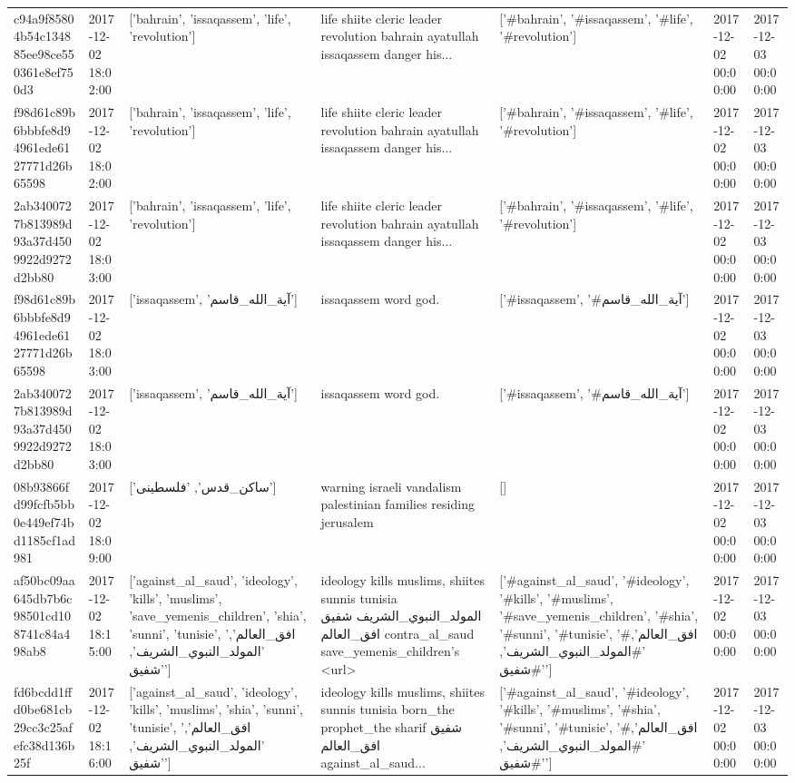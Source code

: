 \begin{tabular}{lllllll}
c94a9f85804b54c134885ee98ce550361e8ef750d3 & 2017-12-02 18:02:00 & ['bahrain', 'issaqassem', 'life', 'revolution'] & life shiite cleric leader revolution bahrain ayatullah issaqassem danger his... & ['#bahrain', '#issaqassem', '#life', '#revolution'] & 2017-12-02 00:00:00 & 2017-12-03 00:00:00 \\
f98d61c89b6bbbfe8d94961ede6127771d26b65598 & 2017-12-02 18:02:00 & ['bahrain', 'issaqassem', 'life', 'revolution'] & life shiite cleric leader revolution bahrain ayatullah issaqassem danger his... & ['#bahrain', '#issaqassem', '#life', '#revolution'] & 2017-12-02 00:00:00 & 2017-12-03 00:00:00 \\
2ab3400727b813989d93a37d4509922d9272d2bb80 & 2017-12-02 18:03:00 & ['bahrain', 'issaqassem', 'life', 'revolution'] & life shiite cleric leader revolution bahrain ayatullah issaqassem danger his... & ['#bahrain', '#issaqassem', '#life', '#revolution'] & 2017-12-02 00:00:00 & 2017-12-03 00:00:00 \\
f98d61c89b6bbbfe8d94961ede6127771d26b65598 & 2017-12-02 18:03:00 & ['issaqassem', 'آية_الله_قاسم'] & issaqassem word god. & ['#issaqassem', '#آية_الله_قاسم'] & 2017-12-02 00:00:00 & 2017-12-03 00:00:00 \\
2ab3400727b813989d93a37d4509922d9272d2bb80 & 2017-12-02 18:03:00 & ['issaqassem', 'آية_الله_قاسم'] & issaqassem word god. & ['#issaqassem', '#آية_الله_قاسم'] & 2017-12-02 00:00:00 & 2017-12-03 00:00:00 \\
08b93866fd99fcfb5bb0e449ef74bd1185cf1ad981 & 2017-12-02 18:09:00 & ['ساکن_قدس', 'فلسطینی'] & warning israeli vandalism palestinian families residing jerusalem & [] & 2017-12-02 00:00:00 & 2017-12-03 00:00:00 \\
af50bc09aa645db7b6c98501cd108741c84a498ab8 & 2017-12-02 18:15:00 & ['against_al_saud', 'ideology', 'kills', 'muslims', 'save_yemenis_children', 'shia', 'sunni', 'tunisie', 'افق_العالم', 'المولد_النبوي_الشريف', 'شفيق'] & ideology kills muslims, shiites sunnis tunisia المولد\_النبوي\_الشريف شفيق افق\_العالم contra\_al\_saud save\_yemenis\_children's <url> & ['#against_al_saud', '#ideology', '#kills', '#muslims', '#save_yemenis_children', '#shia', '#sunni', '#tunisie', '#افق_العالم', '#المولد_النبوي_الشريف', '#شفيق'] & 2017-12-02 00:00:00 & 2017-12-03 00:00:00 \\
fd6bcdd1ffd0be681cb29cc3c25afefc38d136b25f & 2017-12-02 18:16:00 & ['against_al_saud', 'ideology', 'kills', 'muslims', 'shia', 'sunni', 'tunisie', 'افق_العالم', 'المولد_النبوي_الشريف', 'شفيق'] & ideology kills muslims, shiites sunnis tunisia born\_the prophet\_the sharif شفيق افق\_العالم against\_al\_saud... & ['#against_al_saud', '#ideology', '#kills', '#muslims', '#shia', '#sunni', '#tunisie', '#افق_العالم', '#المولد_النبوي_الشريف', '#شفيق'] & 2017-12-02 00:00:00 & 2017-12-03 00:00:00 \\

\end{tabular}
